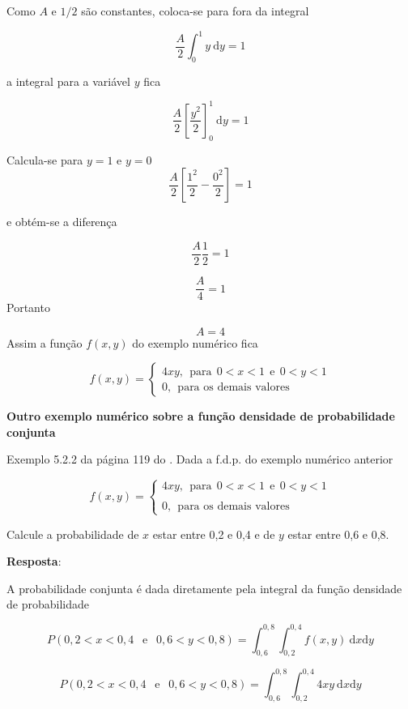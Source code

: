 \documentclass[
]{book}
\begin{document}
Como \(A\) e \(1/2\) são constantes, coloca-se para fora da integral

\[
  \dfrac{A}{2}\int_{0}^{1}y~\text{d}y = 1
\]

a integral para a variável \(y\) fica

\[
  \dfrac{A}{2}\left[ \dfrac{y^2}{2} \right]_{0}^{1}~\text{d}y = 1
\]

Calcula-se para \(y=1\) e \(y=0\)
\[
  \dfrac{A}{2}\left[  \dfrac{1^2}{2} - \dfrac{0^2}{2} \right] = 1
\]

e obtém-se a diferença

\[
  \dfrac{A}{2}\dfrac{1}{2} = 1
\]

\[
  \dfrac{A}{4} = 1
\]
Portanto

\[
  A=4
\]
Assim a função \(f(x,y)\) do exemplo numérico fica

\begin{equation}
  f(x,y) = 
    \begin{cases}
      4xy,~~\text{para}~~0 < x < 1~~\text{e}~~0 < y < 1 \\
      0, ~~\text{para os demais valores}
    \end{cases}
\end{equation}

\textbf{Outro exemplo numérico sobre a função densidade de probabilidade conjunta}

Exemplo 5.2.2 da página 119 do \citet{Sartoris2013}. Dada a f.d.p. do exemplo numérico anterior

\begin{equation}
  f(x,y) = 
    \begin{cases}
      4xy,~~\text{para}~~0 < x < 1~~\text{e}~~0 < y < 1 \\
      \\
      0, ~~\text{para os demais valores}
    \end{cases}
\end{equation}

Calcule a probabilidade de \(x\) estar entre 0,2 e 0,4 e de \(y\) estar entre 0,6 e 0,8.

\textbf{Resposta}:

A probabilidade conjunta é dada diretamente pela integral da função densidade de probabilidade

\[
  P(0,2 < x < 0,4~~\text{ e }~~0,6 < y < 0,8) = \int_{0,6}^{0,8}\int_{0,2}^{0,4}f(x,y)~\text{d}x \text{d}y
\]

\[
  P(0,2 < x < 0,4~~\text{ e }~~0,6 < y < 0,8) = \int_{0,6}^{0,8}\int_{0,2}^{0,4}4xy~\text{d}x \text{d}y
\]
\end{document}
